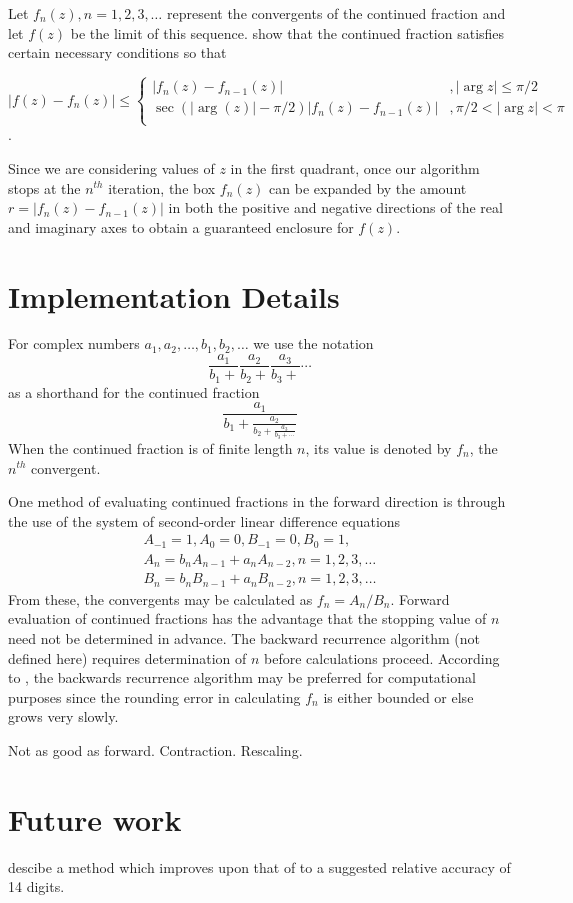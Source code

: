 \documentclass{report}
\begin{document}
Let $f_n(z), n = 1, 2, 3, \ldots$ represent the convergents of the continued
fraction and let $f(z)$ be the limit of this sequence.  \cite{JonesThron} show
that the continued fraction satisfies certain necessary conditions so that

$$
|f(z) - f_n(z)| \leq \left\{
\begin{array}{ll}
|f_n(z) - f_{n-1}(z)|                      &,  |\arg z| \leq \pi/2 \\
\sec(|\arg(z)|-\pi/2)|f_n(z) - f_{n-1}(z)| &,  \pi/2 < |\arg z | < \pi \\
\end{array}
\right.
$$
.

Since we are considering values of $z$ in the first quadrant, once our
algorithm stops at the $n^{th}$ iteration, the box $f_n(z)$ can be 
expanded by the amount $r = |f_n(z) - f_{n-1}(z)|$ in both the positive and
negative directions of the real and imaginary axes to obtain a guaranteed
enclosure for $f(z)$.


\section{Implementation Details}

For complex numbers $a_1, a_2, \ldots, b_1, b_2, \ldots$ we use the notation 
$$
\frac{a_1}{b_1 +} \frac{a_2}{b_2 +} \frac{a_3}{b_3 +} \cdots
$$ 
as a shorthand for the continued fraction
$$
\frac{a_1}{\displaystyle b_1+
   \frac{a_2}{\displaystyle b_2 + 
      \frac{a_3}{b_3 + \cdots}}}
$$
When the continued fraction is of finite length $n$, its value is denoted by
$f_n$, the $n^{th}$ convergent.

One method of evaluating continued fractions in the forward direction is
through the use of the system of second-order linear difference equations
$$
\begin{array}{c}
A_{-1} = 1, A_0 = 0, B_{-1} = 0, B_0 = 1,                 \\
A_n = b_n A_{n-1} + a_n A_{n-2}, n= 1,2,3,\ldots          \\
B_n = b_n B_{n-1} + a_n B_{n-2}, n= 1,2,3,\ldots          
\end{array}
$$
From these, the convergents may be calculated as $f_n = A_n/B_n$.
Forward evaluation of continued fractions has the advantage that the stopping
value of $n$ need not be determined in advance.  The backward recurrence
algorithm (not defined here) requires determination of $n$ before calculations
proceed.  According to \cite{JonesThron}, the backwards recurrence algorithm
may be preferred for computational purposes since the rounding error in
calculating $f_n$ is either bounded or else grows very slowly.

Not as good as forward.  Contraction.  Rescaling.


\section{Future work}

\cite{PoppeWijers} descibe a method which improves upon that of
\cite{Gautschi70} to a suggested relative accuracy of 14 digits.



\end{document}
